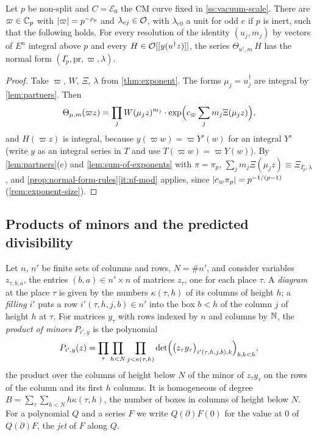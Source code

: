 \begin{theorem}\label{thm:normal-form-theta}
Let $p$ be non-split and $C=\mathcal E_0$ the CM curve fixed in \cref{ss:vacuum-scale}. There are
$\varpi\in\mathbb{C}_p$ with $\lvert \varpi\rvert=p^{-\rho_p}$ and $\lambda_{ej}\in\mathcal{O}$, with $\lambda_{e0}$ a unit for
odd $e$ if $p$ is inert, such that the following holds. For every resolution of the identity
$(u_j,m_j)$ by vectors of $E^n$ integral above $p$ and every $H\in\mathcal{O}[[y(u^\dagger z)]]$, the series
$\Theta_{u^\dagger,m}\,H$ has the normal form $(I_p^\circ,\mathrm{pr},\varpi,\lambda)$.
\end{theorem}

\begin{proof}
Take $\varpi$, $W$, $\Xi$, $\lambda$ from \cref{thm:exponent}. The forms $\mu_j=u_j^\dagger$ are
integral by \cref{lem:partners}. Then
\[
  \Theta_{\mu,m}(\varpi z)=\prod_jW(\mu_jz)^{m_j}\cdot\exp\Bigl(c_\varpi\sum_jm_j\Xi(\mu_jz)\Bigr),
\]
and $H(\varpi z)$ is integral, because $y(\varpi w)=\varpi Y'(w)$ for an integral $Y'$ (write $y$ as an
integral series in $T$ and use $T(\varpi w)=\varpi Y(w)$). By \cref{lem:partners}(c) and
\cref{lem:sum-of-exponents} with $\pi=\pi_p$, $\sum_jm_j\Xi(\mu_jz)\equiv\Xi_{I_p^\circ,\lambda}$, and
\cref{prop:normal-form-rules}\ref{it:nf-mod} applies, since $\lvert c_\varpi\pi_p\rvert=p^{-1/(p-1)}$
(\cref{rem:exponent-size}).
\end{proof}

\subsection{Products of minors and the predicted divisibility}\label{ss:minors}
Let $n$, $n'$ be finite sets of columns and rows, $N=\#n'$, and consider variables $z_{\tau,b,a}$,
the entries $(b,a)\in n'\times n$ of matrices $z_\tau$, one for each place $\tau$. A \emph{diagram}
at the place $\tau$ is given by the numbers $\kappa(\tau,h)$ of its columns of height $h$; a
\emph{filling} $i'$ puts a row $i'(\tau,h,j,b)\in n'$ into the box $b<h$ of the column $j$ of height
$h$ at $\tau$. For matrices $y_\tau$ with rows indexed by $n$ and columns by $\mathbb{N}$, the \emph{product of
minors} $P_{i',y}$ is the polynomial
\[
  P_{i',y}(z)=\prod_\tau\prod_{h<N}\prod_{j<\kappa(\tau,h)}
  \det\Bigl(\bigl(z_\tau y_\tau\bigr)_{i'(\tau,h,j,b),k}\Bigr)_{b,k<h},
\]
the product over the columns of height below $N$ of the minor of $z_\tau y_\tau$ on the rows of the
column and its first $h$ columns. It is homogeneous of degree $B=\sum_\tau\sum_{h<N}h\kappa(\tau,h)$,
the number of boxes in columns of height below $N$. For a polynomial $Q$ and a series $F$ we write
$Q(\partial)F(0)$ for the value at $0$ of $Q(\partial)F$, the \emph{jet} of $F$ along $Q$.

